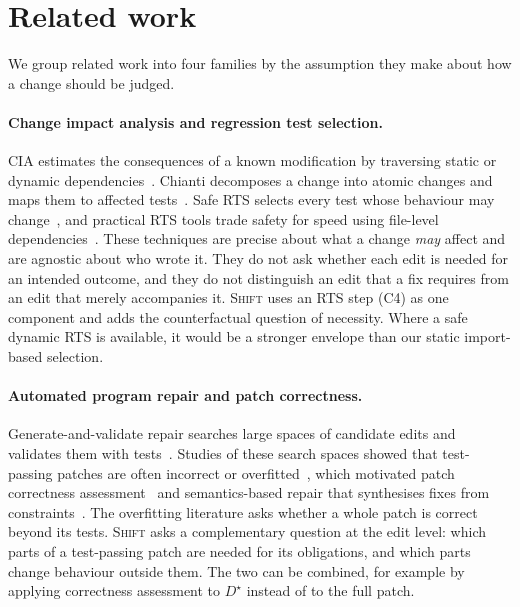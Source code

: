 \documentclass[a4paper,fleqn]{cas-sc}
\newcommand{\tool}{\textsc{Shift}}
\begin{document}
\section{Related work}\label{sec:related}

We group related work into four families by the assumption they make about how a change should be judged.

\paragraph{Change impact analysis and regression test selection.} CIA estimates the consequences of a known modification by traversing static or dynamic dependencies~\citep{bohner1996cia,li2013cia,orso2003field}. Chianti decomposes a change into atomic changes and maps them to affected tests~\citep{ren2004chianti}. Safe RTS selects every test whose behaviour may change~\citep{rothermel1997safe}, and practical RTS tools trade safety for speed using file-level dependencies~\citep{gligoric2015ekstazi}. These techniques are precise about what a change \emph{may} affect and are agnostic about who wrote it. They do not ask whether each edit is needed for an intended outcome, and they do not distinguish an edit that a fix requires from an edit that merely accompanies it. \tool{} uses an RTS step (C4) as one component and adds the counterfactual question of necessity. Where a safe dynamic RTS is available, it would be a stronger envelope than our static import-based selection.

\paragraph{Automated program repair and patch correctness.} Generate-and-validate repair searches large spaces of candidate edits and validates them with tests~\citep{legoues2012genprog,long2016prophet}. Studies of these search spaces showed that test-passing patches are often incorrect or overfitted~\citep{qi2015kali,long2016searchspace,smith2015cure}, which motivated patch correctness assessment~\citep{wang2020apr} and semantics-based repair that synthesises fixes from constraints~\citep{nguyen2013semfix,mechtaev2016angelix}. The overfitting literature asks whether a whole patch is correct beyond its tests. \tool{} asks a complementary question at the edit level: which parts of a test-passing patch are needed for its obligations, and which parts change behaviour outside them. The two can be combined, for example by applying correctness assessment to $D^\star$ instead of to the full patch.
\end{document}
